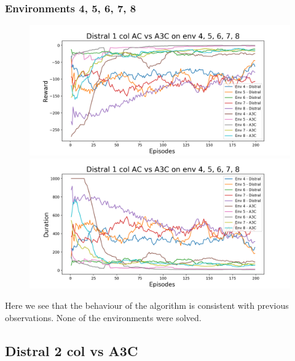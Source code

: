 \documentclass[12pt]{report}
\begin{document}
\subsubsection{Environments 4, 5, 6, 7, 8}
\begin{figure}[H]
\centering
\begin{minipage}{.5\textwidth}
\centering
\includegraphics[width=\textwidth]{figs/d1_col_ac/d1_col_ac_4_5_6_7_8_rwd.png}
\end{minipage}%
\centering
\begin{minipage}{.5\textwidth}
\centering
\includegraphics[width=\textwidth]{figs/d1_col_ac/d1_col_ac_4_5_6_7_8_dur.png}
\end{minipage}%
\end{figure}
Here we see that the behaviour of the algorithm is consistent with previous observations. None of the environments were solved.

\subsection{Distral 2 col vs A3C}
\end{document}
